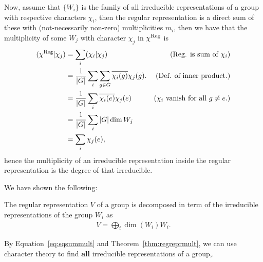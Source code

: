 Now, assume that $\{W_i\}$ is the family of all irreducible representations of a group with respective characters $\chi_i$, then the regular representation is a direct sum of these with (not-necessarily non-zero) multiplicities $m_i$, then we have that the multiplicity of some $W_j$ with character $\chi_j$ in $\chi^{\text{Reg}}$ is
\begin{align*}
	(\chi^{\text{Reg}}|\chi_j)  &=  \sum_i (\chi_i|\chi_j)   & \text{(Reg. is sum of $\chi_i$)}\\
	&= \frac{1}{|G|} \sum_i  \sum_{g \in G} \overline{\chi_i(g) }{\chi_j(g)}. & \text{(Def. of inner product.)} \\
	&=  \frac{1}{|G|}\sum_i  \overline{\chi_i(e) }{\chi_j(e)} & \text{($\chi_i$ vanish for all $g \neq e$.)}\\
	&= \frac{1}{|G|} \sum_i |G|\dim W_j\\
	&= \sum_i \chi_j(e),
\end{align*}
hence the multiplicity of an irreducible representation inside the regular representation is the degree of that irreducible.

We have shown the following:
\begin{theorem}\label{thm:regreprmult}
	The regular representation $V$ of a group is decomposed in term of the irreducible representations of the group $W_i$ as
	\begin{align*}
		V = \bigoplus_i \dim (W_i) W_i.
	\end{align*}
\end{theorem}

\begin{remark}
	By Equation~\ref{eq:sqsummult} and Theorem~\ref{thm:regreprmult}, we can use character theory to find \textbf{all} irreducible representations of a group,.
\end{remark}





